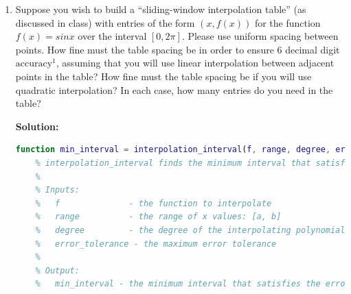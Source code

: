 \documentclass[conference,onecolumn]{IEEEtran}
\begin{document}
\begin{enumerate}[label=\arabic{enumi}.]
\begin{enumerate}
                    For each n, evenly discretize the interval [-1, 1] into $100 \times n$ points, then max among these points.
                    \begin{align*}
                        E_2    & \approx 0.9350888158435888 \\
                        E_4    & \approx 0.596313372781065  \\
                        E_6    & \approx 0.6301901751946674 \\
                        E_8    & \approx 0.7681245303002563 \\
                        E_{10} & \approx 0.9995971865664737 \\
                        E_{12} & \approx 1.3514858830490715 \\
                        E_{14} & \approx 1.8739160198479834 \\
                        E_{16} & \approx 2.6450175325958294 \\
                        E_{18} & \approx 3.783412922067518  \\
                        E_{20} & \approx 5.4696283033072435 \\
                        E_{40} & \approx 290.8113085542939
                    \end{align*}

                    The error estimates make sense because too many data points or too high degree of interpolating function lead to overfitting, which results in a higher maximum error.
          \end{enumerate}
          \clearpage
    \item Suppose you wish to build a “sliding-window interpolation table” (as discussed in class) with entries of the form $(x, f(x))$ for the function $f(x) = sin x$ over the interval $[0, 2\pi]$.
          Please use uniform spacing between points.
          How fine must the table spacing be in order to ensure 6 decimal digit $\text{accuracy}^1$, assuming that you will use linear interpolation between adjacent points in the table?
          How fine must the table spacing be if you will use quadratic interpolation?
          In each case, how many entries do you need in the table?

          \textbf{Solution:}

          \begin{lstlisting}[language=MATLAB]
function min_interval = interpolation_interval(f, range, degree, error_tolerance)
    % interpolation_interval finds the minimum interval that satisfies the error tolerance to interpolate f with given degree of polynomial function.
    %
    % Inputs:
    %   f              - the function to interpolate
    %   range          - the range of x values: [a, b]
    %   degree         - the degree of the interpolating polynomial
    %   error_tolerance - the maximum error tolerance
    %
    % Output:
    %   min_interval - the minimum interval that satisfies the error tolerance


\end{lstlisting}
\end{enumerate}
\end{document}

